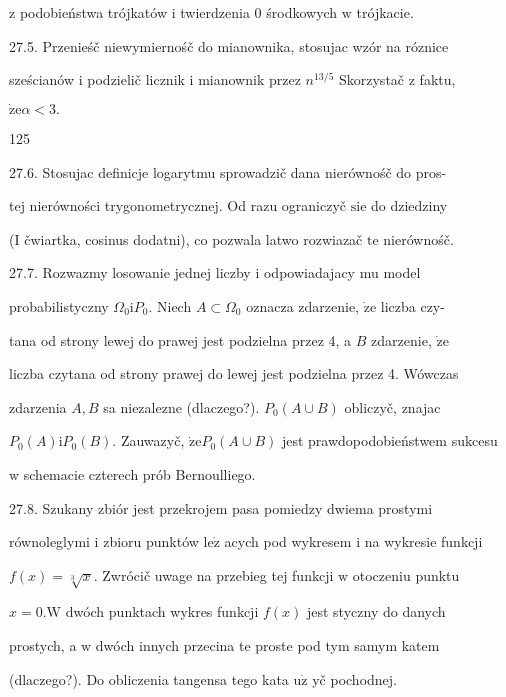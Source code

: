 \documentclass[a4paper,12pt]{article}
\begin{document}
$\mathrm{z}$ podobieństwa trójkatów $\mathrm{i}$ twierdzenia $0$ środkowych $\mathrm{w}$ trójkacie.

27.5. Przenieśč niewymiernośč do mianownika, stosujac wzór na róznice

sześcianów $\mathrm{i}$ podzielič licznik $\mathrm{i}$ mianownik przez $n^{13/5}$ Skorzystač $\mathrm{z}$ faktu,

$\dot{\mathrm{z}}\mathrm{e}\alpha<3.$





125

27.6. Stosujac definicje logarytmu sprowadzič dana nierównośč do pros-

tej nierówności trygonometrycznej. Od razu ograniczyč $\mathrm{s}\mathrm{i}\mathrm{e}$ do dziedziny

(I čwiartka, cosinus dodatni), co pozwala latwo rozwiazač $\mathrm{t}\mathrm{e}$ nierównośč.

27.7. Rozwazmy losowanie jednej liczby $\mathrm{i}$ odpowiadajacy mu model

probabilistyczny $\Omega_{0} \mathrm{i}P_{0}$. Niech $ A\subset \Omega_{0}$ oznacza zdarzenie, $\dot{\mathrm{z}}\mathrm{e}$ liczba czy-

tana od strony lewej do prawej jest podzielna przez 4, a $B$ zdarzenie, $\dot{\mathrm{z}}\mathrm{e}$

liczba czytana od strony prawej do lewej jest podzielna przez 4. Wówczas

zdarzenia $A, B$ sa niezalezne (dlaczego?). $P_{0}(A\cup B)$ obliczyč, znajac

$P_{0}(A)\mathrm{i}P_{0}(B)$. Zauwazyč, $\dot{\mathrm{z}}\mathrm{e}P_{0}(A\cup B)$ jest prawdopodobieństwem sukcesu

$\mathrm{w}$ schemacie czterech prób Bernoulliego.

27.8. Szukany zbiór jest przekrojem pasa pomiedzy dwiema prostymi

równoleglymi $\mathrm{i}$ zbioru punktów $\mathrm{l}\mathrm{e}\dot{\mathrm{z}}$ acych pod wykresem $\mathrm{i}$ na wykresie funkcji

$f(x) = \sqrt[3]{x}$. Zwrócič uwage na przebieg tej funkcji $\mathrm{w}$ otoczeniu punktu

$x = 0. \mathrm{W}$ dwóch punktach wykres funkcji $f(x)$ jest styczny do danych

prostych, a $\mathrm{w}$ dwóch innych przecina te proste pod tym samym katem

(dlaczego?). Do obliczenia tangensa tego kata $\mathrm{u}\dot{\mathrm{z}}$ yč pochodnej.
\end{document}
